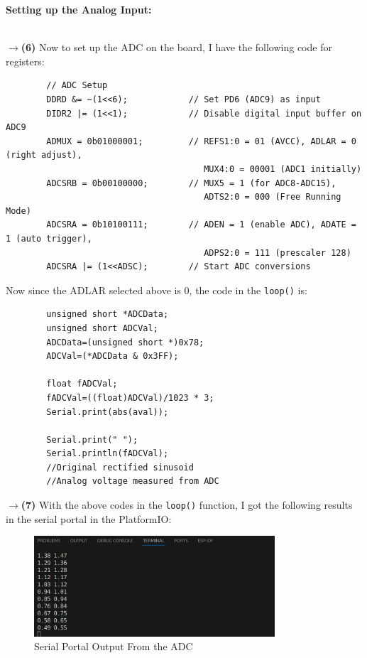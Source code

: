 \documentclass{report}
\begin{document}
    \begin{minipage}{\textwidth}
        \Large
        \textbf{Setting up the Analog Input:}
    \end{minipage}\\[0.5em]
    $\rightarrow$\textbf{(6)} Now to set up the ADC on the board, I have the following code for registers:
    \begin{verbatim}
        // ADC Setup
        DDRD &= ~(1<<6);            // Set PD6 (ADC9) as input
        DIDR2 |= (1<<1);            // Disable digital input buffer on ADC9
        ADMUX = 0b01000001;         // REFS1:0 = 01 (AVCC), ADLAR = 0 (right adjust), 
                                       MUX4:0 = 00001 (ADC1 initially)
        ADCSRB = 0b00100000;        // MUX5 = 1 (for ADC8-ADC15), 
                                       ADTS2:0 = 000 (Free Running Mode)
        ADCSRA = 0b10100111;        // ADEN = 1 (enable ADC), ADATE = 1 (auto trigger), 
                                       ADPS2:0 = 111 (prescaler 128)
        ADCSRA |= (1<<ADSC);        // Start ADC conversions
    \end{verbatim}
    Now since the ADLAR selected above is 0, the code in the \texttt{loop()} is:
    \begin{verbatim}
        unsigned short *ADCData;
        unsigned short ADCVal;
        ADCData=(unsigned short *)0x78;
        ADCVal=(*ADCData & 0x3FF);

        float fADCVal;
        fADCVal=((float)ADCVal)/1023 * 3;
        Serial.print(abs(aval));

        Serial.print(" ");
        Serial.println(fADCVal);
        //Original rectified sinusoid
        //Analog voltage measured from ADC
    \end{verbatim}
    $\rightarrow$\textbf{(7)} With the above codes in the \texttt{loop()} function, I got the following results in the serial portal in the PlatformIO:
    \begin{figure}[H]
        \centering
        \includegraphics[width =    0.8\textwidth]{scope5.png}
        \caption{Serial Portal Output From the ADC}
    \end{figure}
\end{document}
